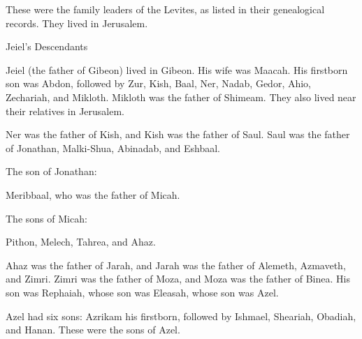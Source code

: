{These
were the family
leaders
of the Levites,
as listed in their genealogical records.
They lived
in Jerusalem.
\par }{\SH Jeiel’s Descendants
\par }{\PP {}Jeiel
(the father
of Gibeon) lived
in Gibeon.
His wife
was Maacah.
His firstborn
son
was Abdon,
followed by Zur,
Kish,
Baal,
Ner,
Nadab,
Gedor,
Ahio,
Zechariah,
and Mikloth.
Mikloth
was the father
of Shimeam.
They
also lived
near
their relatives
in Jerusalem.
\par }{\PP {}Ner
was the father
of Kish,
and Kish
was the father
of Saul.
Saul
was the father
of Jonathan,
Malki-Shua,
Abinadab,
and Eshbaal.
\par }{\PP {}The son
of Jonathan:
\par }{\PP Meribbaal,
who was the father
of Micah.
\par }{\PP {}The sons
of Micah:
\par }{\PP Pithon,
Melech,
Tahrea, and Ahaz.
\par }{\PP {}Ahaz
was the father
of Jarah,
and Jarah
was the father
of Alemeth,
Azmaveth,
and Zimri.
Zimri
was the father
of Moza,
and Moza
was the father
of Binea.
His son was Rephaiah,
whose son
was Eleasah,
whose son
was Azel.
\par }{\PP {}Azel
had six
sons: Azrikam
his firstborn,
followed by Ishmael,
Sheariah,
Obadiah,
and Hanan.
These
were the sons
of Azel.

}
